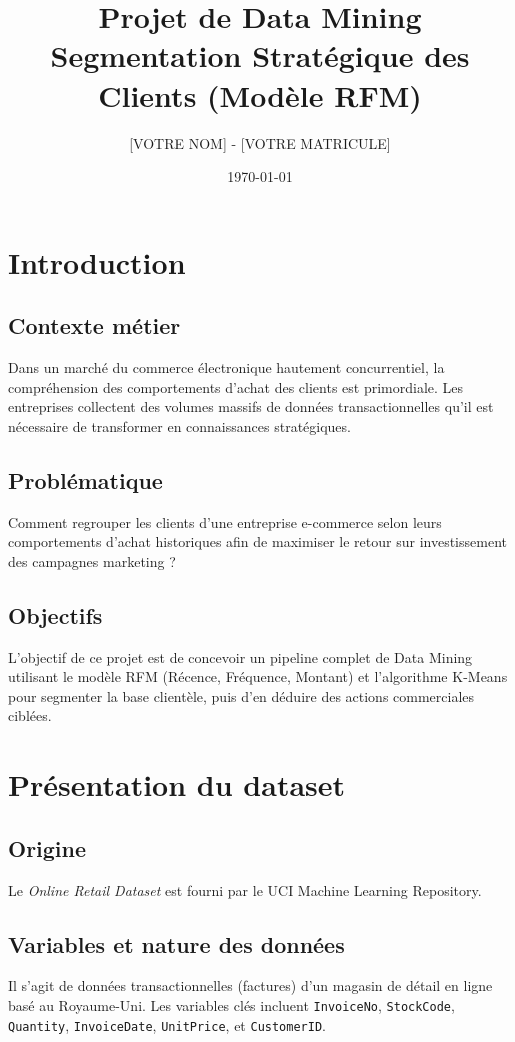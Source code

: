 \documentclass[12pt,a4paper]{article}
\title{Projet de Data Mining \\ \large Segmentation Stratégique des Clients (Modèle RFM)}
\author{[VOTRE NOM] - [VOTRE MATRICULE]}
\date{\today}
\begin{document}
\maketitle
\tableofcontents
\newpage

\section{Introduction}
\subsection{Contexte métier}
Dans un marché du commerce électronique hautement concurrentiel, la compréhension des comportements d'achat des clients est primordiale. Les entreprises collectent des volumes massifs de données transactionnelles qu'il est nécessaire de transformer en connaissances stratégiques.
\subsection{Problématique}
Comment regrouper les clients d'une entreprise e-commerce selon leurs comportements d'achat historiques afin de maximiser le retour sur investissement des campagnes marketing ?
\subsection{Objectifs}
L'objectif de ce projet est de concevoir un pipeline complet de Data Mining utilisant le modèle RFM (Récence, Fréquence, Montant) et l'algorithme K-Means pour segmenter la base clientèle, puis d'en déduire des actions commerciales ciblées.

\section{Présentation du dataset}
\subsection{Origine}
Le \textit{Online Retail Dataset} \cite{uci_online_retail} est fourni par le UCI Machine Learning Repository.
\subsection{Variables et nature des données}
Il s'agit de données transactionnelles (factures) d'un magasin de détail en ligne basé au Royaume-Uni. Les variables clés incluent \texttt{InvoiceNo}, \texttt{StockCode}, \texttt{Quantity}, \texttt{InvoiceDate}, \texttt{UnitPrice}, et \texttt{CustomerID}.
\end{document}
